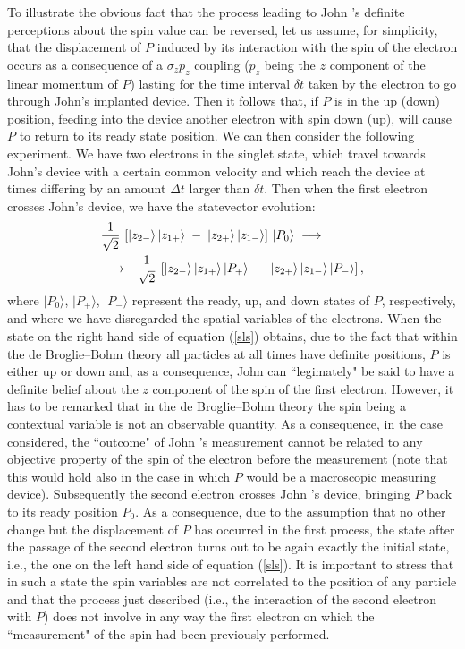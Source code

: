 \documentclass[12pt]{article}
\begin{document}
To illustrate the obvious fact that the process leading to John 's
definite perceptions about the spin value can be reversed, let us
assume, for simplicity, that the displacement of $P$ induced by
its interaction with the spin of the electron occurs as a
consequence of a $\sigma_{z} p_{z}$ coupling ($p_{z}$ being the
$z$ component of the linear momentum of $P$) lasting for the time
interval $\delta t$ taken by the electron to go through John's
implanted device. Then it follows that, if $P$ is in the up (down)
position, feeding into the device another electron with spin down
(up), will cause $P$ to return to its ready state position. We can
then consider the following experiment. We have two electrons in
the singlet state, which travel towards John's device with a
certain common velocity and which reach the device at times
differing by an amount $\Delta t$ larger than $\delta t$. Then
when the first electron crosses John's device, we have the
statevector evolution:
\begin{eqnarray} \label{sls}
\lefteqn{ \frac{1}{\sqrt{2}}\,\left[ |z_{2-}\rangle\,
|z_{1+}\rangle \; - \; |z_{2+}\rangle\, |z_{1-}\rangle \right]\,
|P_{0}\rangle \;
\longrightarrow \qquad\qquad} \nonumber \\
& \longrightarrow & \frac{1}{\sqrt{2}}\,\left[ |z_{2-}\rangle\,
|z_{1+}\rangle \, |P_{+}\rangle \; - \; |z_{2+}\rangle\,
|z_{1-}\rangle\, |P_{-}\rangle \right],
\end{eqnarray}
where $|P_{0}\rangle$, $|P_{+}\rangle$, $|P_{-}\rangle$ represent
the ready, up, and down states of $P$, respectively, and where we
have disregarded the spatial variables of the electrons. When the
state on the right hand side of equation (\ref{sls}) obtains, due
to the fact that within the de Broglie--Bohm theory all particles
at all times have definite positions, $P$ is either up or down
and, as a consequence, John can ``legimately" be said to have a
definite belief about the $z$ component of the spin of the first
electron. However, it has to be remarked that in the de
Broglie--Bohm theory the spin being a contextual variable is
not an observable quantity. As a consequence, in the case considered, the
``outcome" of John 's measurement cannot be related to any objective
property of the spin of the electron before the measurement (note that
this would hold also in the case in which $P$ would be a macroscopic
measuring device). Subsequently the second electron crosses John
's device, bringing $P$ back to its ready position $P_{0}$. As a
consequence, due to the assumption that no other change but the
displacement of $P$ has occurred in the first process, the state
after the passage of the second electron turns out to be again
exactly the initial state, i.e., the one on the left hand side of
equation (\ref{sls}). It is important to stress that in such a
state the spin variables are not correlated to the position of any
particle and that the process just described (i.e., the
interaction of the second electron with $P$) does not involve in
any way the first electron on which the ``measurement" of the spin
had been previously performed.
\end{document}
